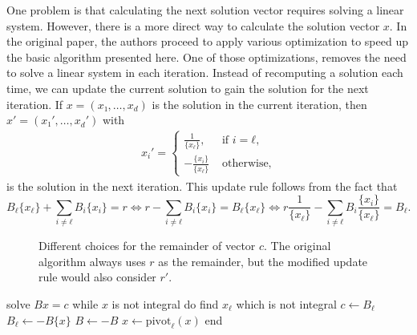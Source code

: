 One problem is that calculating the next solution vector requires solving a
linear system.
However, there is a more direct way to calculate the solution vector $x$.
In the original paper, the authors proceed to apply various optimization
to speed up the basic algorithm presented here.
One of those optimizations, removes the need to solve a linear system in each iteration.
Instead of recomputing a solution each time,
we can update the current solution to gain the solution for the next iteration.
If $x = (x₁, …, x_d)$ is the solution in the current iteration,
then $x' = (x₁', …, x_d')$ with
\begin{align*}
  x_i' =
  \begin{cases}
    \frac{1}{\{x_ℓ\}},  & \text{ if } i = ℓ, \\
    -\frac{\{x_i\}}{\{x_ℓ\}} & \text{ otherwise,}
  \end{cases}
\end{align*}
is the solution in the next iteration.
This update rule follows from the fact that
\[
  B_ℓ \{x_ℓ\} + \sum_{i ≠ ℓ} B_i \{x_i\} = r
  \iff
  r - \sum_{i ≠ ℓ} B_i \{x_i\} = B_ℓ \{x_ℓ\}
  \iff
  r \frac{1}{\{x_ℓ\}} - \sum_{i ≠ ℓ} B_i \frac{\{x_i\}}{\{x_ℓ\}} = B_ℓ.
\]



\begin{figure}[tbp]
  \centering
  
  \caption{
    Different choices for the remainder of vector $c$. The original algorithm
    always uses $r$ as the remainder, but the modified update rule would also consider $r'$.}
\end{figure}

\begin{Pseudocode}[
    float=tbp,
    label={lst:modified-generalized-euclidean},
    caption={
      The modified algorithm, where the solution $x$ remains entirely positive in each iterations.
      The linear system from the original algorithm is replaced by the update rule.
      The two negations ensure that the vectors represent the correct solution,
      when the modified update rule from Equation~\ref{eq:modified-update-rule} is used.
    }]
solve $Bx = c$
while $x$ is not integral do
  find $x_ℓ$ which is not integral
  $c ← B_ℓ$
  $B_ℓ ← -B\{x\}$
  $B ← -B$
  $x ← \mathrm{pivot}_ℓ(x)$
end
\end{Pseudocode}

